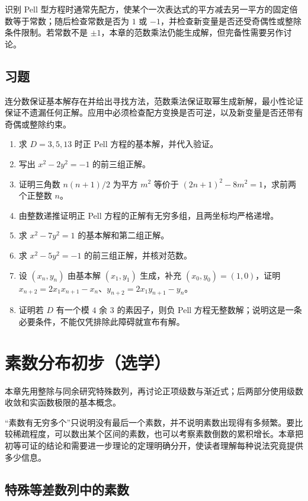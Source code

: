 \documentclass[UTF8,12pt,a4paper,fontset=fandol]{ctexbook}
\begin{document}
识别 Pell 型方程时通常先配方，使某个一次表达式的平方减去另一平方的固定倍数等于常数；随后检查常数是否为 $1$ 或 $-1$，并检查新变量是否还受奇偶性或整除条件限制。若常数不是 $\pm1$，本章的范数乘法仍能生成解，但完备性需要另作讨论。

\section{习题}

连分数保证基本解存在并给出寻找方法，范数乘法保证取幂生成新解，最小性论证保证不遗漏任何正解。应用中必须检查配方变换是否可逆，以及新变量是否还带有奇偶或整除约束。

\begin{enumerate}
 \item 求 $D=3,5,13$ 时正 Pell 方程的基本解，并代入验证。
 \item 写出 $x^2-2y^2=-1$ 的前三组正解。
 \item 证明三角数 $n(n+1)/2$ 为平方 $m^2$ 等价于 $(2n+1)^2-8m^2=1$，求前两个正整数 $n$。
 \item 由整数递推证明正 Pell 方程的正解有无穷多组，且两坐标均严格递增。
 \item\label{ex:pell-seven} 求 $x^2-7y^2=1$ 的基本解和第二组正解。
 \item\label{ex:pell-negative-five} 求 $x^2-5y^2=-1$ 的前三组正解，并核对范数。
 \item\label{ex:pell-second-order} 设 $(x_n,y_n)$ 由基本解 $(x_1,y_1)$ 生成，补充 $(x_0,y_0)=(1,0)$，证明 $x_{n+2}=2x_1x_{n+1}-x_n$、$y_{n+2}=2x_1y_{n+1}-y_n$。
 \item\label{ex:pell-obstruction} 证明若 $D$ 有一个模 $4$ 余 $3$ 的素因子，则负 Pell 方程无整数解；说明这是一条必要条件，不能仅凭排除此障碍就宣布有解。
\end{enumerate}

\chapter{素数分布初步（选学）}
\label{ch:prime-distribution}

本章先用整除与同余研究特殊数列，再讨论正项级数与渐近式；后两部分使用级数收敛和实函数极限的基本概念。

“素数有无穷多个”只说明没有最后一个素数，并不说明素数出现得有多频繁。要比较稀疏程度，可以数出某个区间的素数，也可以考察素数倒数的累积增长。本章把初等可证的结论和需要进一步理论的定理明确分开，使读者理解每种说法究竟提供多少信息。

\section{特殊等差数列中的素数}
\end{document}

